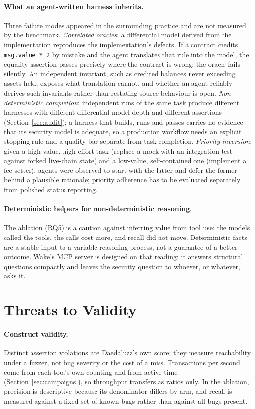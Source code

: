 \documentclass[11pt,a4paper]{article}
\newcommand{\wake}{Wake}
\begin{document}
\paragraph{What an agent-written harness inherits.}
Three failure modes appeared in the surrounding practice and are not measured by the benchmark. \emph{Correlated oracles}: a differential model derived from the implementation reproduces the implementation's defects. If a contract credits \texttt{msg.value * 2} by mistake and the agent translates that rule into the model, the equality assertion passes precisely where the contract is wrong; the oracle fails silently. An independent invariant, such as credited balances never exceeding assets held, exposes what translation cannot, and whether an agent reliably derives such invariants rather than restating source behaviour is open. \emph{Non-deterministic completion}: independent runs of the same task produce different harnesses with different differential-model depth and different assertions (Section~\ref{sec:audit}); a harness that builds, runs and passes carries no evidence that its security model is adequate, so a production workflow needs an explicit stopping rule and a quality bar separate from task completion. \emph{Priority inversion}: given a high-value, high-effort task (replace a mock with an integration test against forked live-chain state) and a low-value, self-contained one (implement a fee setter), agents were observed to start with the latter and defer the former behind a plausible rationale; priority adherence has to be evaluated separately from polished status reporting.

\paragraph{Deterministic helpers for non-deterministic reasoning.}
The ablation (RQ5) is a caution against inferring value from tool use: the models called the tools, the calls cost more, and recall did not move. Deterministic facts are a stable input to a variable reasoning process, not a guarantee of a better outcome. \wake{}'s MCP server is designed on that reading: it answers structural questions compactly and leaves the security question to whoever, or whatever, asks it.

\section{Threats to Validity}
\label{sec:threats}

\paragraph{Construct validity.}
Distinct assertion violations are Daedaluzz's own score; they measure reachability under a fuzzer, not bug severity or the cost of a miss. Transactions per second come from each tool's own counting and from active time (Section~\ref{sec:campaigns}), so throughput transfers as ratios only. In the ablation, precision is descriptive because its denominator differs by arm, and recall is measured against a fixed set of known bugs rather than against all bugs present.
\end{document}
